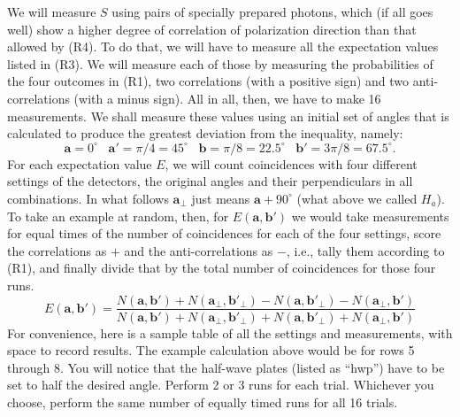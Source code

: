 We will measure $S$ using pairs of specially prepared photons, which (if all goes well) show a higher degree of
correlation of polarization direction than that allowed by (R4). To do that, we will have to measure
all the expectation values listed in (R3). We will measure each of those by measuring the probabilities
of the four outcomes in (R1), two correlations (with a positive sign) and two anti-correlations (with
a minus sign). All in all, then, we have to make 16 measurements. We shall measure these values using
an initial set of angles that is calculated to produce the greatest deviation from the inequality, namely:
\begin{equation*}
\pmb{a} = 0^\circ \;\;\; \pmb{a'} = \pi/4 = 45^\circ \;\;\;\pmb{b} = \pi/8 = 22.5^\circ 
\;\;\; \pmb{b'} = 3\pi/8 = 67.5^\circ.
\end{equation*}
For each expectation value $E$, we will count coincidences with four different settings of the detectors,
the original angles and their perpendiculars in all combinations. In what follows $\pmb{a}_\perp$ just
means $\pmb{a} + 90^\circ$ (what above we called $H_a$). To take an example at random, then, for 
$E(\pmb{a},\pmb{b'})$ we would take
measurements for equal times of the number of coincidences for each of the four settings, score the correlations as $+$ and the anti-correlations as $-$, i.e., tally them 
according to (R1), and finally divide that by the total number of coincidences for those four runs.
\begin{equation*}
E(\pmb{a},\pmb{b'}) = \frac{N(\pmb{a},\pmb{b'}) + N(\pmb{a}_\perp,\pmb{b'}_\perp) - N(\pmb{a},\pmb{b'}_\perp) - N(\pmb{a}_\perp,\pmb{b'})}{N(\pmb{a},\pmb{b'}) + N(\pmb{a}_\perp,\pmb{b'}_\perp) + N(\pmb{a},\pmb{b'}_\perp) + N(\pmb{a}_\perp,\pmb{b'})}
\end{equation*}
For convenience, here is a sample table of all the settings and measurements, with space to record results.
The example calculation above would be for rows 5 through 8. You will notice that the half-wave plates 
(listed as ``hwp'') have to be set to half the desired angle. Perform 2 or 3 runs for each trial. Whichever you choose, perform the same number of equally timed runs for all 16 trials.

